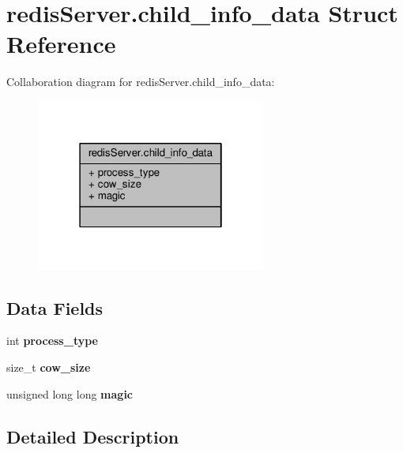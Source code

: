 \hypertarget{structredisServer_8child__info__data}{}\section{redis\+Server.\+child\+\_\+info\+\_\+data Struct Reference}
\label{structredisServer_8child__info__data}


Collaboration diagram for redis\+Server.\+child\+\_\+info\+\_\+data\+:\nopagebreak
\begin{figure}[H]
\begin{center}
\leavevmode
\includegraphics[width=214pt]{structredisServer_8child__info__data__coll__graph}
\end{center}
\end{figure}
\subsection*{Data Fields}
\begin{DoxyCompactItemize}
\item 
\mbox{\label{structredisServer_8child__info__data_a66145cb4acef7a7b61a2814042e406cc}} 
int {\bfseries process\+\_\+type}
\item 
\mbox{\label{structredisServer_8child__info__data_adbd0b5f2a3f6c9b564b100efb1c4adc6}} 
size\+\_\+t {\bfseries cow\+\_\+size}
\item 
\mbox{\label{structredisServer_8child__info__data_a2f3a4fccca6406e35bcf33e92dd93135}} 
unsigned long long {\bfseries magic}
\end{DoxyCompactItemize}


\subsection{Detailed Description}



